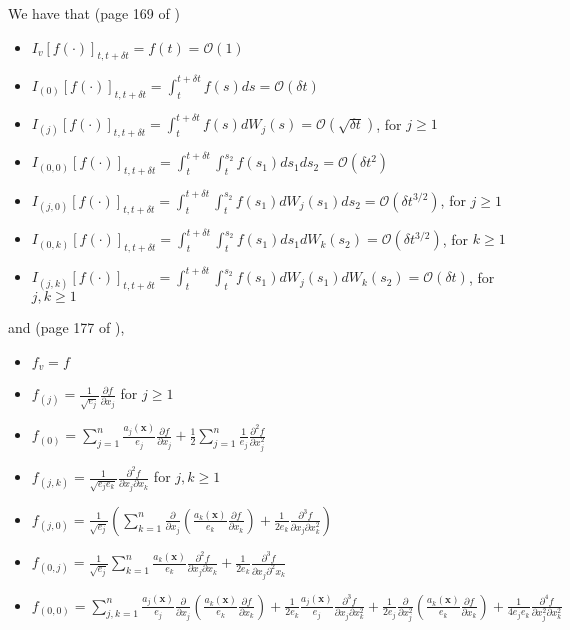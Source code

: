 We have that (page 169 of \cite{kloeden1992numerical})
\begin{itemize}
\item $I_v [f(\cdot)]_{t, t + \delta t} = f(t) = \mathcal{O}(1)$
\item $I_{(0)} [f(\cdot)]_{t, t + \delta t} = \int_{t}^{t + \delta t} f(s) ds = \mathcal{O}(\delta t)$
\item $I_{(j)} [f(\cdot)]_{t, t + \delta t} = \int_{t}^{t + \delta t} f(s) dW_j(s) = \mathcal{O}(\sqrt{\delta t})$, for $j \ge 1$
\item $I_{(0,0)} [f(\cdot)]_{t, t + \delta t} = \int_{t}^{t + \delta t} \int_{t}^{s_2} f(s_1) ds_1 ds_2 = \mathcal{O}(\delta t^2)$
\item $I_{(j,0)} [f(\cdot)]_{t, t + \delta t} = \int_{t}^{t + \delta t} \int_{t}^{s_2} f(s_1) dW_j(s_1) ds_2 = \mathcal{O}(\delta t^{3/2})$, for $j \ge 1$
\item $I_{(0,k)} [f(\cdot)]_{t, t + \delta t} = \int_{t}^{t + \delta t} \int_{t}^{s_2} f(s_1) ds_1 dW_k(s_2) = \mathcal{O}(\delta t^{3/2})$, for $k \ge 1$
\item $I_{(j,k)} [f(\cdot)]_{t, t + \delta t} = \int_{t}^{t + \delta t} \int_{t}^{s_2} f(s_1) dW_j(s_1) dW_k(s_2) = \mathcal{O}(\delta t)$, for $j, k \ge 1$
\end{itemize}
%
and (page 177 of \cite{kloeden1992numerical}),
%
\begin{itemize}
\item $f_v = f$
\item $f_{(j)} = \frac{1}{\sqrt{e_j}} \frac{\partial f}{\partial x_j}$ for $j \ge 1$
\item $f_{(0)} = \sum_{j=1}^n \frac{a_j(\mathbf{x})}{e_j} \frac{\partial f}{\partial x_j} + \frac{1}{2}\sum_{j=1}^n \frac{1}{e_j} \frac{\partial^2 f}{\partial x_j^2}$
\item $f_{(j, k)} = \frac{1}{\sqrt{e_j e_k}} \frac{\partial^2 f}{\partial x_j \partial x_k}$ for $j,k \ge 1$
\item $f_{(j,0)} = \frac{1}{\sqrt{e_j}} \left( \sum_{k=1}^n \frac{\partial}{\partial x_j} \left( \frac{a_k(\mathbf{x})}{e_k} \frac{\partial f}{\partial x_k} \right) + \frac{1}{2 e_k} \frac{\partial^3 f}{\partial x_j \partial x_k^2} \right)$
\item $f_{(0, j)} = \frac{1}{\sqrt{e_j}} \sum_{k=1}^n \frac{a_k(\mathbf{x})}{e_k} \frac{\partial^2 f}{\partial x_j \partial x_k} +\frac{1}{2 e_k}  \frac{\partial^3 f}{\partial x_j \partial^2 x_k}$
\item $f_{(0,0)} = \sum_{j,k=1}^n \frac{a_j(\mathbf{x})}{e_j} \frac{\partial}{\partial x_j} \left( \frac{a_k(\mathbf{x})}{e_k} \frac{\partial f}{\partial x_k} \right) + \frac{1}{2 e_k}\frac{a_j(\mathbf{x})}{e_j} \frac{\partial^3 f}{\partial x_j \partial x_k^2} + \frac{1}{2 e_j} \frac{\partial}{\partial x_j^2} \left( \frac{a_k(\mathbf{x})}{e_k} \frac{\partial f}{\partial x_k} \right) + \frac{1}{4 e_j e_k} \frac{\partial^4 f}{\partial x_j^2 \partial x_k^2}$
\end{itemize}
